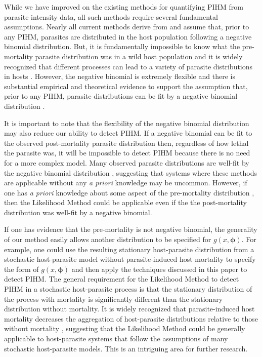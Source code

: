 \documentclass[12pt, a4paper]{article}
\begin{document}
While we have improved on the existing methods for quantifying
PIHM from parasite intensity data, all such methods require several
fundamental assumptions.  Nearly all current methods derive from \cite{Crofton1971a} \citep[but see][]{Ferguson2011} and assume that, prior to any PIHM, parasites are distributed in the host population following a
negative binomial distribution. But, it is fundamentally impossible to know
what the pre-mortality parasite distribution was in a wild host population and
it is widely recognized that different processes can lead to a variety of
parasite distributions in hosts \citep{Anderson1982a, Duerr2003}. However, the negative binomial is extremely
flexible and there is substantial empirical and theoretical evidence to support
the assumption that, prior to any PIHM, parasite distributions can be fit by a negative binomial distribution \citep{Shaw1995,Shaw1998,Wilson2002}.

It is important to note that the flexibility of the negative binomial distribution may also reduce our ability to detect PIHM. If
a negative binomial can be fit to the observed post-mortality parasite
distribution then, regardless of how lethal the parasite was, it will be
impossible to detect PIHM because there is no need for a more complex model.
Many observed parasite distributions are well-fit by the negative binomial distribution \citep{Shaw1998}, suggesting
that systems where these methods are applicable without any \emph{a priori} knowledge may be uncommon. However, if one has \emph{a priori} knowledge about some aspect of the pre-mortality distribution \citep[e.g. assumes/knows the value of $k_p$,][]{Ferguson2011}, then the Likelihood Method could be applicable even if the the post-mortality distribution was well-fit by a negative binomial.

If one has evidence that the pre-mortality is not negative binomial, the generality of our method easily allows another distribution to be specified for $g(x, \boldsymbol{\phi})$. For example, one could use the
resulting stationary host-parasite distribution from a stochastic host-parasite
model without parasite-induced host mortality \citep{Anderson1982a} to specify
the form of $g(x, \boldsymbol{\phi})$ and then apply the techniques discussed
in this paper to detect PIHM.  The general requirement
for the Likelihood Method to detect PIHM in a stochastic host-parasite process
is that the stationary distribution of the process with
mortality is significantly different than the stationary distribution without mortality.
It is widely recognized that parasite-induced host mortality decreases the
aggregation of host-parasite distributions relative to those without mortality
\citep{Barbour2000}, suggesting that the Likelihood Method could be generally applicable to host-parasite systems that follow the assumptions of many stochastic host-parasite models.  This is an intriguing area for further research.
\end{document}
